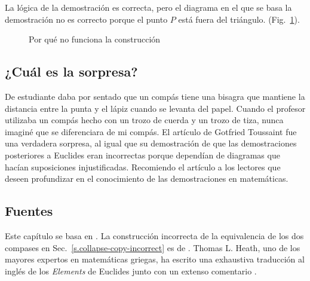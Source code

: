 La lógica de la demostración es correcta, pero el diagrama en el que se basa la demostración no es correcto porque el punto $P$ está fuera del triángulo. (Fig.~\ref{f.collapse--2}).

\begin{figure}[b]
\begin{center}
\caption{Por qué no funciona la construcción}\label{f.collapse--2}
\end{center}
\end{figure}

\subsection*{¿Cuál es la sorpresa?}

De estudiante daba por sentado que un compás tiene una bisagra que mantiene la distancia entre la punta y el lápiz cuando se levanta del papel. Cuando el profesor utilizaba un compás hecho con un trozo de cuerda y un trozo de tiza, nunca imaginé que se diferenciara de mi compás. El artículo de Gotfried Toussaint fue una verdadera sorpresa, al igual que su demostración de que las demostraciones posteriores a Euclides eran incorrectas porque dependían de diagramas que hacían suposiciones injustificadas. Recomiendo el artículo a los lectores que deseen profundizar en el conocimiento de las demostraciones en matemáticas.

\subsection*{Fuentes}

Este capítulo se basa en \cite{toussaint}. La construcción incorrecta de la equivalencia de los dos compases en Sec.~\ref{s.collapse-copy-incorrect} es de \cite{rusty}. Thomas L. Heath, uno de los mayores expertos en matemáticas griegas, ha escrito una exhaustiva traducción al inglés de los \textit{Elements} de Euclides junto con un extenso comentario \cite{euclid}.
